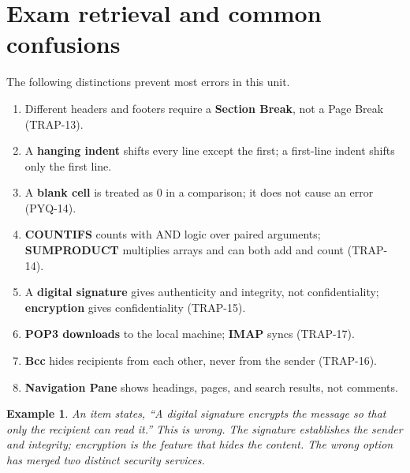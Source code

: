\documentclass[11pt]{article}
\newtheorem{example}{Example}[section]
\begin{document}
\section{Exam retrieval and common confusions}
The following distinctions prevent most errors in this unit.
\begin{enumerate}
  \item Different headers and footers require a \textbf{Section Break}, not a
    Page Break (TRAP-13).
  \item A \textbf{hanging indent} shifts every line except the first; a
    first-line indent shifts only the first line.
  \item A \textbf{blank cell} is treated as 0 in a comparison; it does not
    cause an error (PYQ-14).
  \item \textbf{COUNTIFS} counts with AND logic over paired arguments;
    \textbf{SUMPRODUCT} multiplies arrays and can both add and count
    (TRAP-14).
  \item A \textbf{digital signature} gives authenticity and integrity, not
    confidentiality; \textbf{encryption} gives confidentiality (TRAP-15).
  \item \textbf{POP3 downloads} to the local machine; \textbf{IMAP} syncs
    (TRAP-17).
  \item \textbf{Bcc} hides recipients from each other, never from the sender
    (TRAP-16).
  \item \textbf{Navigation Pane} shows headings, pages, and search results,
    not comments.
\end{enumerate}

\begin{example}
An item states, ``A digital signature encrypts the message so that only the
recipient can read it.'' This is wrong. The signature establishes the sender
and integrity; encryption is the feature that hides the content. The wrong
option has merged two distinct security services.
\end{example}
\end{document}
